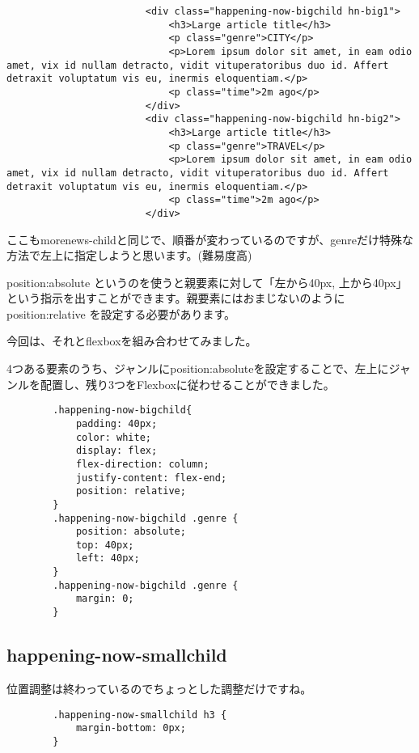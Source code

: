 \documentclass[mingoth,11pt,a4j,uplatex,dvipdfmx]{jsarticle}
\begin{document}
\begin{lstlisting}
                        <div class="happening-now-bigchild hn-big1">
                            <h3>Large article title</h3>
                            <p class="genre">CITY</p>
                            <p>Lorem ipsum dolor sit amet, in eam odio amet, vix id nullam detracto, vidit vituperatoribus duo id. Affert detraxit voluptatum vis eu, inermis eloquentiam.</p>
                            <p class="time">2m ago</p>
                        </div>
                        <div class="happening-now-bigchild hn-big2">
                            <h3>Large article title</h3>
                            <p class="genre">TRAVEL</p>
                            <p>Lorem ipsum dolor sit amet, in eam odio amet, vix id nullam detracto, vidit vituperatoribus duo id. Affert detraxit voluptatum vis eu, inermis eloquentiam.</p>
                            <p class="time">2m ago</p>
                        </div>
\end{lstlisting}


ここもmorenews-childと同じで、順番が変わっているのですが、genreだけ特殊な方法で左上に指定しようと思います。(難易度高)

position:absolute というのを使うと親要素に対して「左から40px, 上から40px」という指示を出すことができます。親要素にはおまじないのようにposition:relative を設定する必要があります。

今回は、それとflexboxを組み合わせてみました。

4つある要素のうち、ジャンルにposition:absoluteを設定することで、左上にジャンルを配置し、残り3つをFlexboxに従わせることができました。

\begin{lstlisting}
        .happening-now-bigchild{
            padding: 40px;
            color: white;
            display: flex;
            flex-direction: column;
            justify-content: flex-end;
            position: relative;
        }
        .happening-now-bigchild .genre {
            position: absolute;
            top: 40px;
            left: 40px;
        }
        .happening-now-bigchild .genre {
            margin: 0;
        }
\end{lstlisting}

\subsection{happening-now-smallchild}
位置調整は終わっているのでちょっとした調整だけですね。

\begin{lstlisting}
        .happening-now-smallchild h3 {
            margin-bottom: 0px;
        }
\end{lstlisting}
\end{document}
